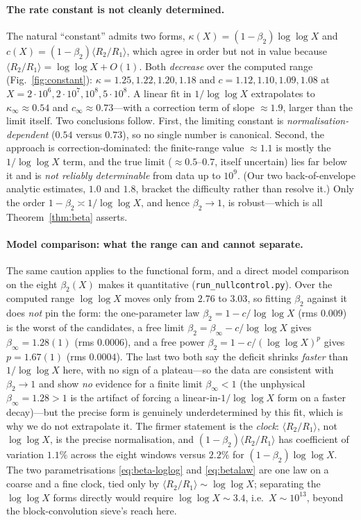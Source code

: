 \documentclass[]{interact}%
\begin{document}
\paragraph{The rate constant is not cleanly determined.}
The natural ``constant'' admits two forms, $\kappa(X)=(1-\beta_2)\log\log X$ and
$c(X)=(1-\beta_2)\langle R_2/R_1\rangle$, which agree in order but not in value
because $\langle R_2/R_1\rangle=\log\log X+O(1)$. Both \emph{decrease} over the
computed range (Fig.~\ref{fig:constant}): $\kappa=1.25,1.22,1.20,1.18$ and
$c=1.12,1.10,1.09,1.08$ at $X=2\cdot10^{6},2\cdot10^{7},10^{8},5\cdot10^{8}$.
A linear fit in $1/\log\log X$ extrapolates to $\kappa_\infty\approx0.54$ and
$c_\infty\approx0.73$---with a correction term of slope $\approx1.9$, larger than
the limit itself. Two conclusions follow. First, the limiting constant is
\emph{normalisation-dependent} ($0.54$ versus $0.73$), so no single number is
canonical. Second, the approach is correction-dominated: the finite-range value
$\approx1.1$ is mostly the $1/\log\log X$ term, and the true limit ($\approx0.5$--$0.7$,
itself uncertain) lies far below it and is \emph{not reliably determinable} from data
up to $10^{9}$. (Our two back-of-envelope analytic estimates, $1.0$ and $1.8$, bracket
the difficulty rather than resolve it.) Only the order $1-\beta_2\asymp1/\log\log X$,
and hence $\beta_2\to1$, is robust---which is all Theorem~\ref{thm:beta} asserts.

\paragraph{Model comparison: what the range can and cannot separate.}
The same caution applies to the functional form, and a direct model comparison on the eight
$\beta_2(X)$ makes it quantitative (\texttt{run\_nullcontrol.py}). Over the computed range
$\log\log X$ moves only from $2.76$ to $3.03$, so fitting $\beta_2$ against it does \emph{not} pin
the form: the one-parameter law $\beta_2=1-c/\log\log X$ (rms $0.009$) is the worst of the
candidates, a free limit $\beta_2=\beta_\infty-c/\log\log X$ gives $\beta_\infty=1.28(1)$ (rms
$0.0006$), and a free power $\beta_2=1-c/(\log\log X)^p$ gives $p=1.67(1)$ (rms $0.0004$). The last
two both say the deficit shrinks \emph{faster} than $1/\log\log X$ here, with no sign of a
plateau---so the data are consistent with $\beta_2\to1$ and show \emph{no} evidence for a finite
limit $\beta_\infty<1$ (the unphysical $\beta_\infty=1.28>1$ is the artifact of forcing a
linear-in-$1/\log\log X$ form on a faster decay)---but the precise form is genuinely
underdetermined by this fit, which is why we do not extrapolate it. The firmer statement is the
\emph{clock}: $\langle R_2/R_1\rangle$, not $\log\log X$, is the precise normalisation, and
$(1-\beta_2)\langle R_2/R_1\rangle$ has coefficient of variation $1.1\%$ across the eight windows
versus $2.2\%$ for $(1-\beta_2)\log\log X$. The two parametrisations \eqref{eq:beta-loglog} and
\eqref{eq:betalaw} are one law on a coarse and a fine clock, tied only by
$\langle R_2/R_1\rangle\sim\log\log X$; separating the $\log\log X$ forms directly would require
$\log\log X\sim3.4$, i.e.\ $X\sim10^{13}$, beyond the block-convolution sieve's reach here.
\end{document}
